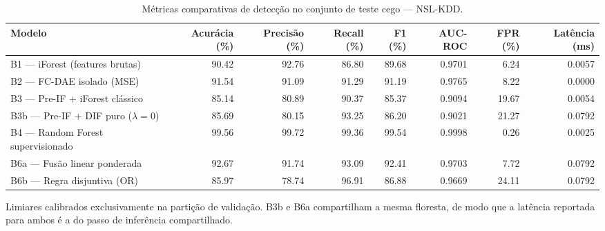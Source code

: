 \begin{table}[htbp]
\centering
\caption{Métricas comparativas de detecção no conjunto de teste cego — NSL-KDD.}
\label{tab:tabela4-nsl-kdd}
\small
\begin{tabular}{lrrrrrrr}
\hline
Modelo & Acurácia (\%) & Precisão (\%) & Recall (\%) & F1 (\%) & AUC-ROC & FPR (\%) & Latência (ms) \\
\hline
B1 — iForest (features brutas) & 90.42 & 92.76 & 86.80 & 89.68 & 0.9701 & 6.24 & 0.0057 \\
B2 — FC-DAE isolado (MSE) & 91.54 & 91.09 & 91.29 & 91.19 & 0.9765 & 8.22 & 0.0000 \\
B3 — Pre-IF + iForest clássico & 85.14 & 80.89 & 90.37 & 85.37 & 0.9094 & 19.67 & 0.0054 \\
B3b — Pre-IF + DIF puro ($\lambda = 0$) & 85.69 & 80.15 & 93.25 & 86.20 & 0.9021 & 21.27 & 0.0792 \\
B4 — Random Forest supervisionado & 99.56 & 99.72 & 99.36 & 99.54 & 0.9998 & 0.26 & 0.0025 \\
B6a — Fusão linear ponderada & 92.67 & 91.74 & 93.09 & 92.41 & 0.9703 & 7.72 & 0.0792 \\
B6b — Regra disjuntiva (OR) & 85.97 & 78.74 & 96.91 & 86.88 & 0.9669 & 24.11 & 0.0792 \\
\hline
\end{tabular}
\begin{flushleft}\footnotesize Limiares calibrados exclusivamente na partição de validação. B3b e B6a compartilham a mesma floresta, de modo que a latência reportada para ambos é a do passo de inferência compartilhado.\end{flushleft}
\end{table}
